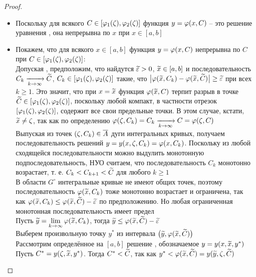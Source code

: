\begin{proof}
\begin{enumerate}
        \begin{itemize}
        	\item Поскольку для всякого $ C \in [\varphi_1(\zeta), \varphi_2(\zeta)] $ функция $ y = \varphi(x, C) $ -- это решение уравнения , она непрерывна по $ x $ при $ x \in [a, b] $
            \item Покажем, что для всякого $ x \in [a, b] $ функция $ y = \varphi(x, C) $ непрерывна по $ C $ при $ C \in [\varphi_1(\zeta), \varphi_2(\zeta)] $: \\
            Допуская , предположим, что найдутся $ \widetilde{\varepsilon} > 0 $, $ \widetilde{x} \in [a, b] $ и последовательность $ C_k \xrightarrow[{k} \to {\infty}]{} \widetilde{C} $, $ C_k \in [\varphi_1(\zeta), \varphi_2(\zeta)] $ такие, что $ \big| \varphi(\widetilde{x}, C_k) - \varphi(\widetilde{x}, \widetilde{C}) \big| \ge \widetilde{\varepsilon} $ при всех $ k \ge 1 $. Это значит, что при $ x = \widetilde{x} $ функция $ \varphi(\widetilde{x}, C) $ терпит разрыв в точке $ \widetilde{C} \in [\varphi_1(\zeta), \varphi_2(\zeta)] $, поскольку любой компакт, в частности отрезок $ [\varphi_1(\zeta), \varphi_2(\zeta)] $, содержит все свои предельные точки. В этом случае, кстати, $ \widetilde{x} \ne \zeta $, так как по определению $ \varphi(\zeta, C_k) = C_k \xrightarrow[{k} \to {\infty}]{} C = \varphi(\zeta, C) $ \\
            Выпуская из точек $ (\zeta, C_k) \in \overline{A} $ дуги интегральных кривых, получаем последовательность решений $ y = y(x, \zeta, C_k) = \varphi(x, C_k) $. Поскольку из любой сходящейся последовательности можно выдулить монотонную подпоследовательность, НУО считаем, что последовательность $ C_k $ монотонно возрастает, т. е. $ C_k < C_{k + 1} < \widetilde{C} $ для любого $ k \ge 1 $ \\
            В области $ G^\circ $ интегральные кривые не имеют общих точек, поэтому последовательность $ \varphi(\widetilde{x}, C_k) $ тоже монотонно возрастает и ограничена, так как $ \varphi(\widetilde{x}, C_k) \le \varphi(\widetilde{x}, \widetilde{C}) - \widetilde{\varepsilon} $ по предположению. Но любая ограниченная монотонная последовательность имеет предел \\
            Пусть $ \widetilde{y} = \lim\limits_{k\to\infty} \varphi(\widetilde{x}, C_k) $, тогда $ \widetilde{y} \le \varphi(\widetilde{x}, \widetilde{C}) - \widetilde{\varepsilon} $ \\
            Выберем произвольную точку $ y^* $ из интервала $ \big( \widetilde{y}, \varphi(\widetilde{x}, \widetilde{C}) \big) $ \\
            Рассмотрим определённое на $ [a, b] $ решение , обозначаемое $ y = y(x, \widetilde{x}, y^*) $ \\
            Пусть $ C^* = y(\zeta, \widetilde{x}, y^*) $. Тогда $ C^* < \widetilde{C} $, так как $ y^* < \varphi(\widetilde{x}, \widetilde{C}) = y(\widetilde{y}, \zeta, \widetilde{C}) $ \\

\end{itemize}
\end{enumerate}
\end{proof}
